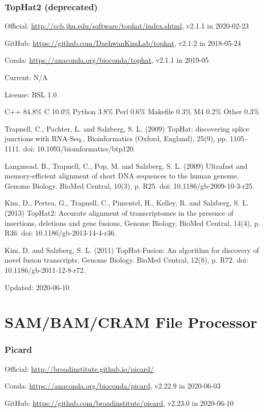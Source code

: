 \documentclass[]{article}
\begin{document}
\section{TopHat2 (deprecated)}

Official: \url{http://ccb.jhu.edu/software/tophat/index.shtml}, v2.1.1 in 2020-02-23

GitHub: \url{https://github.com/DaehwanKimLab/tophat}, v2.1.2 in 2018-05-24

Conda: \url{https://anaconda.org/bioconda/tophat}, v2.1.1 in 2019-05

Current: N/A

License: BSL 1.0

C++ 84.8\% C 10.0\% Python 3.8\% Perl 0.6\% Makefile 0.3\% M4 0.2\% Other 0.3\%

Trapnell, C., Pachter, L. and Salzberg, S. L. (2009) TopHat: discovering splice junctions with RNA-Seq., Bioinformatics (Oxford, England), 25(9), pp. 1105–1111. doi: 10.1093/bioinformatics/btp120.

Langmead, B., Trapnell, C., Pop, M. and Salzberg, S. L. (2009) Ultrafast and memory-efficient alignment of short DNA sequences to the human genome, Genome Biology. BioMed Central, 10(3), p. R25. doi: 10.1186/gb-2009-10-3-r25.

Kim, D., Pertea, G., Trapnell, C., Pimentel, H., Kelley, R. and Salzberg, S. L. (2013) TopHat2: Accurate alignment of transcriptomes in the presence of insertions, deletions and gene fusions, Genome Biology. BioMed Central, 14(4), p. R36. doi: 10.1186/gb-2013-14-4-r36.

Kim, D. and Salzberg, S. L. (2011) TopHat-Fusion: An algorithm for discovery of novel fusion transcripts, Genome Biology. BioMed Central, 12(8), p. R72. doi: 10.1186/gb-2011-12-8-r72.

Updated: 2020-06-10

\part{SAM/BAM/CRAM File Processor}

\section{Picard}

Official: \url{http://broadinstitute.github.io/picard/}

Conda: \url{https://anaconda.org/bioconda/picard}, v2.22.9 in 2020-06-03

GitHub: \url{https://github.com/broadinstitute/picard}, v2.23.0 in 2020-06-10
\end{document}
